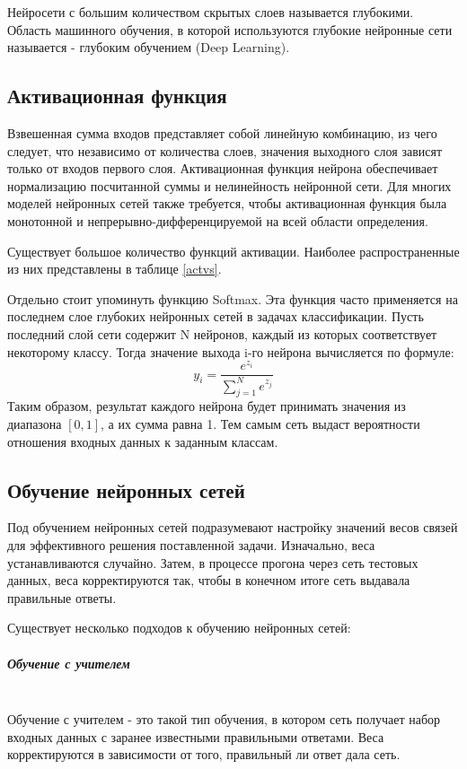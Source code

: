 Нейросети с большим количеством скрытых слоев называется глубокими. Область машинного обучения, в которой используются глубокие нейронные сети называется - глубоким обучением (Deep Learning).     

\subsection{Активационная функция}
\label{sec:activation}
Взвешенная сумма входов представляет собой линейную комбинацию, из чего следует, что независимо от количества слоев, значения выходного слоя зависят только от входов первого слоя. 
Активационная функция нейрона обеспечивает нормализацию посчитанной суммы и нелинейность нейронной сети. Для многих моделей нейронных сетей также требуется, чтобы активационная функция была монотонной и непрерывно-дифференцируемой на всей области определения.

Существует большое количество функций активации. Наиболее распространенные из них представлены в таблице \ref{actvs}.



Отдельно стоит упоминуть функцию Softmax. Эта функция часто применяется на последнем слое глубоких нейронных сетей в задачах классификации. Пусть последний слой сети содержит N нейронов, каждый из которых соответствует некоторому классу. Тогда значение выхода i-го нейрона вычисляется по формуле: 
\[
    y_i=\frac{e^{z_i}}{\sum_{j=1}^{N}e^{z_j}}
\]
Таким образом, результат каждого нейрона будет принимать значения из диапазона $[0,1]$, а их сумма равна 1. Тем самым сеть выдаст вероятности отношения входных данных к заданным классам.
\subsection{Обучение нейронных сетей}
Под обучением нейронных сетей подразумевают настройку значений весов связей для эффективного решения поставленной задачи. Изначально, веса устанавливаются случайно. Затем, в процессе прогона через сеть тестовых данных, веса корректируются так, чтобы в конечном итоге сеть выдавала правильные ответы. 

Существует несколько подходов к обучению нейронных сетей:

\subparagraph{Обучение с учителем} \mbox{} \\
Обучение с учителем - это такой тип обучения, в котором сеть получает набор входных данных с заранее известными правильными ответами. Веса корректируются в зависимости от того, правильный ли ответ дала сеть. 


